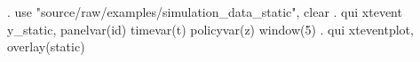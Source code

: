 . use "source/raw/examples/simulation_data_static", clear
{\smallskip}
. qui xtevent y_static, panelvar(id) timevar(t) policyvar(z) window(5)
{\smallskip}
. qui xteventplot, overlay(static) 
{\smallskip}
